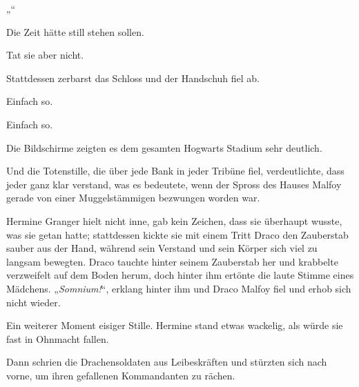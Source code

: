 „“

Die Zeit hätte still stehen sollen.

Tat sie aber nicht.

Stattdessen zerbarst das Schloss und der Handschuh fiel ab.

Einfach so.

Einfach so.

Die Bildschirme zeigten es dem gesamten Hogwarts Stadium sehr deutlich.

Und die Totenstille, die über jede Bank in jeder Tribüne fiel, verdeutlichte, dass jeder ganz klar verstand, was es bedeutete, wenn der Spross des Hauses Malfoy gerade von einer Muggelstämmigen bezwungen worden war.

Hermine Granger hielt nicht inne, gab kein Zeichen, dass sie überhaupt wusste, was sie getan hatte; stattdessen kickte sie mit einem Tritt Draco den Zauberstab sauber aus der Hand, während sein Verstand und sein Körper sich viel zu langsam bewegten. Draco tauchte hinter seinem Zauberstab her und krabbelte verzweifelt auf dem Boden herum, doch hinter ihm ertönte die laute Stimme eines Mädchens. „\emph{Somnium!}“, erklang hinter ihm und Draco Malfoy fiel und erhob sich nicht wieder.

Ein weiterer Moment eisiger Stille. Hermine stand etwas wackelig, als würde sie fast in Ohnmacht fallen.

Dann schrien die Drachensoldaten aus Leibeskräften und stürzten sich nach vorne, um ihren gefallenen Kommandanten zu rächen.

